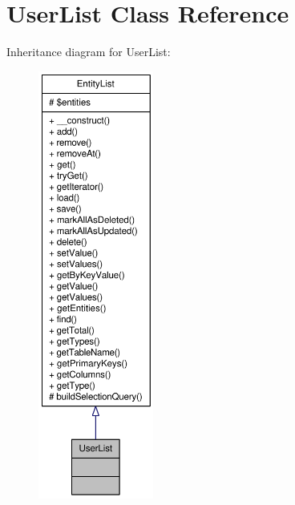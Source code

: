 \hypertarget{classUserList}{
\section{UserList Class Reference}
\label{classUserList}
}


Inheritance diagram for UserList:\nopagebreak
\begin{figure}[H]
\begin{center}
\leavevmode
\includegraphics[height=400pt]{classUserList__inherit__graph}
\end{center}
\end{figure}


